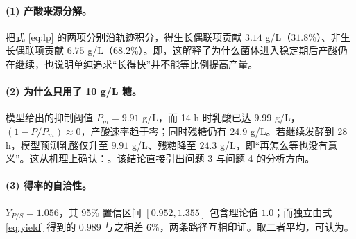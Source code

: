\paragraph{(1) 产酸来源分解。}把式 \eqref{eq:lp} 的两项分别沿轨迹积分，得生长偶联项贡献 $3.14$ g/L（$31.8\%$）、非生长偶联项贡献 $6.75$ g/L（$68.2\%$）。即，这解释了为什么菌体进入稳定期后产酸仍在继续，也说明单纯追求“长得快”并不能等比例提高产量。

\paragraph{(2) 为什么只用了 10 g/L 糖。}模型给出的抑制阈值 $P_m=9.91$ g/L，而 14 h 时乳酸已达 $9.99$ g/L，$(1-P/P_m)\approx0$，产酸速率趋于零；同时残糖仍有 $24.9$ g/L。若继续发酵到 28 h，模型预测乳酸仅升至 $9.91$ g/L、残糖降至 $24.3$ g/L，即“再怎么等也没有意义”。这从机理上确认：。该结论直接引出问题 3 与问题 4 的分析方向。

\paragraph{(3) 得率的自洽性。}$Y_{P/S}=1.056$，其 95\% 置信区间 $[0.952,1.355]$ 包含理论值 $1.0$；而独立由式 \eqref{eq:yield} 得到的 $0.989$ 与之相差 $6\%$，两条路径互相印证。取二者平均，可认为。
